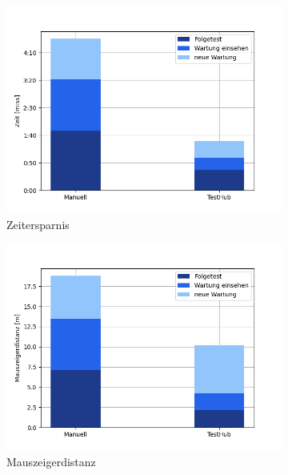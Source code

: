 \begin{figure}[H]
    \centering
    \begin{subfigure}{.5\textwidth}
      \centering
      \includegraphics[width=\linewidth]{resources/validierung_Zeit.png}
      \caption{Zeitersparnis}
    \end{subfigure}%
    \begin{subfigure}{.5\textwidth}
      \centering
      \includegraphics[width=\linewidth]{resources/validierung_cursordistanz.png}
      \caption{Mauszeigerdistanz}
    \end{subfigure}\\
    \begin{subfigure}{.5\textwidth}
        \centering

\end{subfigure}
\end{figure}
